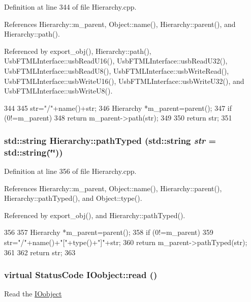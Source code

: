 Definition at line 344 of file Hierarchy.cpp.

References Hierarchy::m\_\-parent, Object::name(), Hierarchy::parent(), and Hierarchy::path().

Referenced by export\_\-obj(), Hierarchy::path(), UsbFTMLInterface::usbReadU16(), UsbFTMLInterface::usbReadU32(), UsbFTMLInterface::usbReadU8(), UsbFTMLInterface::usbWriteRead(), UsbFTMLInterface::usbWriteU16(), UsbFTMLInterface::usbWriteU32(), and UsbFTMLInterface::usbWriteU8().


\begin{DoxyCode}
344                                       {
345   str="/"+name()+str;
346   Hierarchy *m_parent=parent();
347   if (0!=m_parent){
348     return m_parent->path(str);
349   }
350   return str;
351 }
\end{DoxyCode}
\hypertarget{classHierarchy_a1efd56cd164d328d2002e53a10a19b8c}{
\subsubsection[{pathTyped}]{\setlength{\rightskip}{0pt plus 5cm}std::string Hierarchy::pathTyped (std::string {\em str} = {\ttfamily std::string(\char`\"{}\char`\"{})})}}
\label{classHierarchy_a1efd56cd164d328d2002e53a10a19b8c}


Definition at line 356 of file Hierarchy.cpp.

References Hierarchy::m\_\-parent, Object::name(), Hierarchy::parent(), Hierarchy::pathTyped(), and Object::type().

Referenced by export\_\-obj(), and Hierarchy::pathTyped().


\begin{DoxyCode}
356                                            {
357   Hierarchy *m_parent=parent();
358   if (0!=m_parent){
359     str="/"+name()+"["+type()+"]"+str;
360     return m_parent->pathTyped(str);
361   }
362   return str;
363 }
\end{DoxyCode}
\hypertarget{classIOobject_aa07610c11963b1db6710e3c76ceea456}{
\subsubsection[{read}]{\setlength{\rightskip}{0pt plus 5cm}virtual {\bf StatusCode} IOobject::read ()}}
\label{classIOobject_aa07610c11963b1db6710e3c76ceea456}
Read the \hyperlink{classIOobject}{IOobject} 

